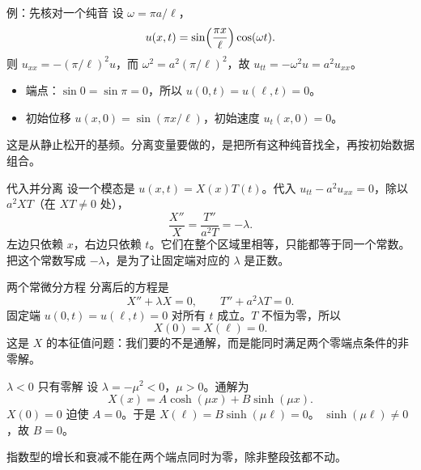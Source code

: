 \documentclass[fontset=windows, chinese, 10pt, xcolor=dvipsnames]{beamer}
\begin{document}
\begin{frame}{例：先核对一个纯音}
  设 $\omega=\pi a/\ell$，
  \begin{equation*}
    u(x,t)=\sin\Bigl(\frac{\pi x}{\ell}\Bigr)\cos(\omega t).
  \end{equation*}
  则 $u_{xx}=-(\pi/\ell)^2 u$，而 $\omega^2=a^2(\pi/\ell)^2$，故 $u_{tt}=-\omega^2 u=a^2 u_{xx}$。
  \begin{itemize}
    \item 端点：$\sin 0=\sin\pi=0$，所以 $u(0,t)=u(\ell,t)=0$。
    \item 初始位移 $u(x,0)=\sin(\pi x/\ell)$，初始速度 $u_t(x,0)=0$。
  \end{itemize}
  这是从静止松开的基频。分离变量要做的，是把所有这种纯音找全，再按初始数据组合。
\end{frame}

\begin{frame}{代入并分离}
  设一个模态是 $u(x,t)=X(x)T(t)$。代入 $u_{tt}-a^2u_{xx}=0$，除以 $a^2XT$（在 $XT\neq 0$ 处），
  \begin{equation*}
    \frac{X''}{X}=\frac{T''}{a^2T}=-\lambda.
  \end{equation*}
  左边只依赖 $x$，右边只依赖 $t$。它们在整个区域里相等，只能都等于同一个常数。把这个常数写成 $-\lambda$，是为了让固定端对应的 $\lambda$ 是正数。
\end{frame}

\begin{frame}{两个常微分方程}
  分离后的方程是
  \begin{equation*}
    X''+\lambda X=0,
    \qquad
    T''+a^2\lambda T=0.
  \end{equation*}
  固定端 $u(0,t)=u(\ell,t)=0$ 对所有 $t$ 成立。$T$ 不恒为零，所以
  \begin{equation*}
    X(0)=X(\ell)=0.
  \end{equation*}
  这是 $X$ 的本征值问题：我们要的不是通解，而是能同时满足两个零端点条件的非零解。
\end{frame}

\begin{frame}{$\lambda<0$ 只有零解}
  设 $\lambda=-\mu^2<0$，$\mu>0$。通解为
  \begin{equation*}
    X(x)=A\cosh(\mu x)+B\sinh(\mu x).
  \end{equation*}
  $X(0)=0$ 迫使 $A=0$。于是 $X(\ell)=B\sinh(\mu\ell)=0$。
  $\sinh(\mu\ell)\neq 0$，故 $B=0$。
  \vspace{0.4em}

  指数型的增长和衰减不能在两个端点同时为零，除非整段弦都不动。
\end{frame}
\end{document}
